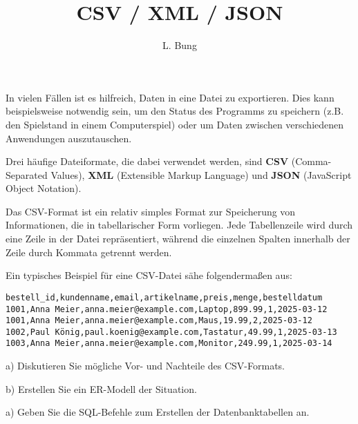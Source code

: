 \documentclass[11pt, a4paper, oneside]{article}
\begin{document}
	\author{L. Bung}
	\title{CSV / XML / JSON}
	\subject{SAE}
	\maketitle
	
	In vielen Fällen ist es hilfreich, Daten in eine Datei zu exportieren.
	Dies kann beispielsweise notwendig sein, um den Status des Programms zu speichern (z.B. den Spielstand in einem Computerspiel) oder um Daten zwischen verschiedenen Anwendungen auszutauschen.
	
	Drei häufige Dateiformate, die dabei verwendet werden, sind \textbf{CSV} (Comma-Separated Values), \textbf{XML} (Extensible Markup Language) und \textbf{JSON} (JavaScript Object Notation).
	
	
	Das CSV-Format ist ein relativ simples Format zur Speicherung von Informationen, die in tabellarischer Form vorliegen.
	Jede Tabellenzeile wird durch eine Zeile in der Datei repräsentiert, während die einzelnen Spalten innerhalb der Zeile durch Kommata getrennt werden.
	
	
	Ein typisches Beispiel für eine CSV-Datei sähe folgendermaßen aus:
	
	\begin{lstlisting}
bestell_id,kundenname,email,artikelname,preis,menge,bestelldatum
1001,Anna Meier,anna.meier@example.com,Laptop,899.99,1,2025-03-12
1001,Anna Meier,anna.meier@example.com,Maus,19.99,2,2025-03-12
1002,Paul König,paul.koenig@example.com,Tastatur,49.99,1,2025-03-13
1003,Anna Meier,anna.meier@example.com,Monitor,249.99,1,2025-03-14
	\end{lstlisting}
	
	a) Diskutieren Sie mögliche Vor- und Nachteile des CSV-Formats.
	
	\lines[5cm]
	
	b) Erstellen Sie ein ER-Modell der Situation.
	
	\boxarea[7cm]
	
	
	a) Geben Sie die SQL-Befehle zum Erstellen der Datenbanktabellen an.
	
\end{document}
